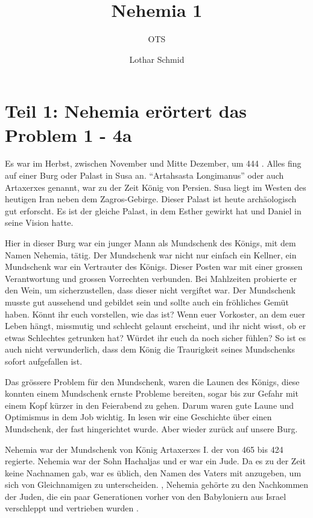 \documentclass[fontsize=16pt]{mybib}
\author{OTS}
\title{Nehemia 1}
\author{Lothar Schmid}
\date{}
\begin{document}
\mytitlepage
\tableofcontents
\flushbottom
\newpage

\section{Teil 1: Nehemia erörtert das Problem 1 - 4a}


Es war im Herbst, zwischen November und Mitte Dezember, um 444 \vChr. Alles fing auf einer Burg oder Palast in Susa an. \enquote{Artahsasta Longimanus} oder auch Artaxerxes genannt, war zu der Zeit König von Persien. Susa liegt im Westen des heutigen Iran neben dem Zagros-Gebirge. Dieser Palast ist heute archäologisch gut erforscht. Es ist der gleiche Palast, in dem Esther gewirkt hat und Daniel in  seine Vision hatte.

Hier in dieser Burg war ein junger Mann als Mundschenk des Königs, mit dem Namen Nehemia, tätig. Der Mundschenk war nicht nur einfach ein Kellner, ein Mundschenk war ein Vertrauter des Königs. Dieser Posten war mit einer grossen Verantwortung und grossen Vorrechten verbunden. Bei Mahlzeiten probierte er den Wein, um sicherzustellen, dass dieser nicht vergiftet war. Der Mundschenk musste gut aussehend und gebildet sein und sollte auch ein fröhliches Gemüt haben. Könnt ihr euch vorstellen, wie das ist? Wenn euer Vorkoster, an dem euer Leben hängt, missmutig und schlecht gelaunt erscheint, und ihr nicht wisst, ob er etwas Schlechtes getrunken hat? Würdet ihr euch da noch sicher fühlen? 
So ist es auch nicht verwunderlich, dass dem König die Traurigkeit seines Mundschenks sofort aufgefallen ist. 

Das grössere Problem für den Mundschenk, waren die Launen des Königs, diese konnten einem Mundschenk ernste Probleme bereiten, sogar bis zur Gefahr mit einem Kopf kürzer in den Feierabend zu gehen. Darum  waren gute Laune und Optimismus in dem Job wichtig. In  lesen wir eine Geschichte über einen Mundschenk, der fast hingerichtet wurde. Aber wieder zurück auf unsere Burg.

Nehemia war der Mundschenk von König Artaxerxes I. der von 465 bis 424 \vChr{} regierte. Nehemia war der Sohn Hachaljas und er war ein Jude. Da es zu der Zeit keine Nachnamen gab, war es üblich, den Namen des Vaters mit anzugeben, um sich von Gleichnamigen zu unterscheiden. ,  Nehemia gehörte zu den Nachkommen der Juden, die ein paar Generationen vorher von den Babyloniern aus Israel verschleppt und vertrieben wurden .
\end{document}
